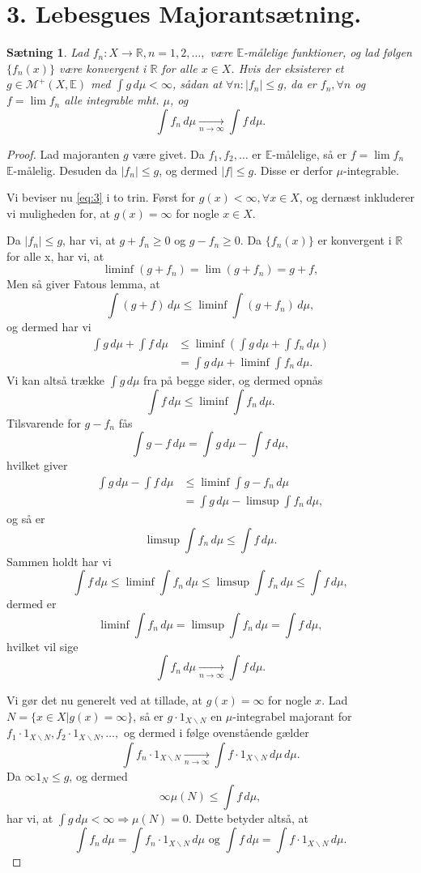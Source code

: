 \documentclass[12pt]{report}
\newtheorem{theorem}[lemma]{Sætning}
\theoremstyle{break}
\newtheorem*{proof}{Bevis}
\theoremstyle{break}
\newcommand{\Int}[1]{\int#1\,d\mu}
\newcommand{\RR}{\mathbb{R}}
\newcommand{\EE}{\mathbb{E}}
\newcommand{\M}{\mathcal{M}^+}
\newcommand{\1}{\mathds{1}}
\begin{document}
\section*{3. Lebesgues Majorantsætning.}
\begin{theorem}
Lad $f_n\colon X\to\RR, n=1,2,\ldots,$ være $\EE$-målelige funktioner, og lad følgen $\{f_n(x)\}$ være konvergent i $\RR$ for alle $x\in X$. Hvis der eksisterer et $g\in\M(X,\EE)$ med $\int g\, d\mu<\infty$, sådan at $\forall n: \lvert f_n\rvert\leq g$, da er $f_n, \forall n$ og $f=\lim f_n$ alle integrable mht. $\mu$, og 
\begin{equation}\label{eq:3}
\int f_n \, d\mu \xrightarrow[n\to\infty]{}\int f\, d\mu.
\end{equation}
\end{theorem}
\begin{proof}
Lad majoranten $g$ være givet. Da $f_1, f_2,\ldots$ er $\EE$-målelige, så er $f= \lim f_n$ $\EE$-målelig. Desuden da $\lvert f_n\rvert\leq g$, og dermed $\lvert f\rvert\leq g$. Disse er derfor $\mu$-integrable.

\bigskip

\noindent Vi beviser nu \eqref{eq:3} i to trin. Først for $g(x)<\infty, \forall x\in X$, og dernæst inkluderer vi muligheden for, at $g(x)=\infty$ for nogle $x\in X$.

\bigskip

\noindent Da $\lvert f_n\rvert \leq g$, har vi, at $g+f_n\geq 0$ og $g-f_n\geq 0$. Da $\{f_n(x)\}$ er konvergent i $\RR$ for alle x, har vi, at
\[\liminf(g+f_n)=\lim(g+f_n)=g+f,\]
Men så giver Fatous lemma, at
\[\int (g+f) \, d\mu\leq\liminf\int(g+f_n)\,d\mu,\]
og dermed har vi
\begin{align*}
\Int{g}+\Int{f} & \leq\liminf\left(\Int{g}+\Int{f_n}\right) \\ & = \Int{g}+\liminf\Int{f_n}.
\end{align*}
Vi kan altså trække $\Int{g}$ fra på begge sider, og dermed opnås
\[\Int{f}\leq\liminf\Int{f_n}.\]
Tilsvarende for $g-f_n$ fås 
\[\Int{g-f}=\Int{g}-\Int{f},\]
hvilket giver
\begin{align*}
\Int{g}-\Int{f}&\leq\liminf\Int{g-f_n}\\&=\Int{g}-\limsup\Int{f_n},
\end{align*}
og så er
\[\limsup\Int{f_n}\leq\Int{f}.\]
Sammen holdt har vi
\[\Int{f}\leq\liminf\Int{f_n}\leq\limsup\Int{f_n}\leq\Int{f},\]
dermed er
\[\liminf\Int{f_n}=\limsup\Int{f_n}=\Int{f},\]
hvilket vil sige
\[\Int{f_n}\xrightarrow[n\to\infty]{}\Int{f}.\]

\bigskip

Vi gør det nu generelt ved at tillade, at $g(x)=\infty$ for nogle $x$. Lad $N=\{x\in X\vert g(x)=\infty\}$, så er $g\cdot 1_{X\backslash N}$ en $\mu$-integrabel majorant for $f_1\cdot 1_{X\backslash N}, f_2\cdot 1_{X\backslash N},\ldots,$ og dermed i følge ovenstående gælder
\[\Int{f_n\cdot 1_{X\backslash N}\xrightarrow[n\to\infty]{}\Int{f\cdot 1_{X\backslash N}}}.\]
Da $\infty 1_N\leq g$, og dermed \[\infty\mu(N) \leq \Int{f},\]
har vi, at $\Int{g}<\infty\Rightarrow\mu(N)=0$. Dette betyder altså, at
\[\Int{f_n}=\Int{f_n\cdot 1_{X\backslash N}}\text{ og }\Int{f}=\Int{f\cdot 1_{X\backslash N}}.\]
\end{proof}
\end{document}

